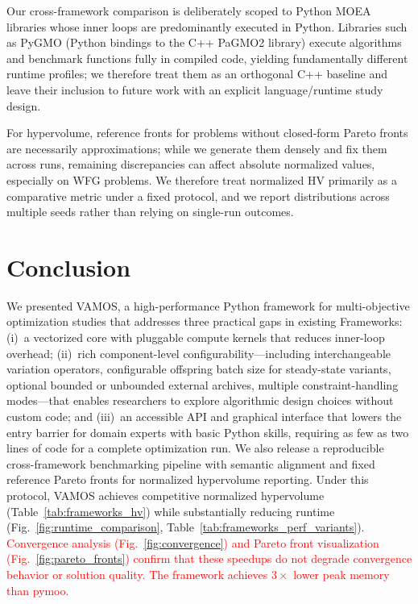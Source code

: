\documentclass[journal]{IEEEtran}
\newcommand{\VAMOS}{VAMOS}
\begin{document}
Our cross-framework comparison is deliberately scoped to Python MOEA libraries whose inner loops are predominantly executed in Python. Libraries such as PyGMO (Python bindings to the C++ PaGMO2 library) execute algorithms and benchmark functions fully in compiled code, yielding fundamentally different runtime profiles; we therefore treat them as an orthogonal C++ baseline and leave their inclusion to future work with an explicit language/runtime study design.

For hypervolume, reference fronts for problems without closed-form Pareto fronts are necessarily approximations; while we generate them densely and fix them across runs, remaining discrepancies can affect absolute normalized values, especially on WFG problems. We therefore treat normalized HV primarily as a comparative metric under a fixed protocol, and we report distributions across multiple seeds rather than relying on single-run outcomes.

\section{Conclusion}
\label{sec:conclusions}

We presented \VAMOS{}, a high-performance Python framework for multi-objective optimization studies that addresses three practical gaps in existing Frameworks: (i)~a vectorized core with pluggable compute kernels that reduces inner-loop overhead; (ii)~rich component-level configurability---including interchangeable variation operators, configurable offspring batch size for steady-state variants, optional bounded or unbounded external archives, multiple constraint-handling modes---that enables researchers to explore algorithmic design choices without custom code; and (iii)~an accessible API and graphical interface that lowers the entry barrier for domain experts with basic Python skills, requiring as few as two lines of code for a complete optimization run. We also release a reproducible cross-framework benchmarking pipeline with semantic alignment and fixed reference Pareto fronts for normalized hypervolume reporting. Under this protocol, \VAMOS{} achieves competitive normalized hypervolume (Table~\ref{tab:frameworks_hv}) while substantially reducing runtime (Fig.~\ref{fig:runtime_comparison}, Table~\ref{tab:frameworks_perf_variants}). \textcolor{red}{Convergence analysis (Fig.~\ref{fig:convergence}) and Pareto front visualization (Fig.~\ref{fig:pareto_fronts}) confirm that these speedups do not degrade convergence behavior or solution quality. The framework achieves $3\times$ lower peak memory than pymoo.}
\end{document}
